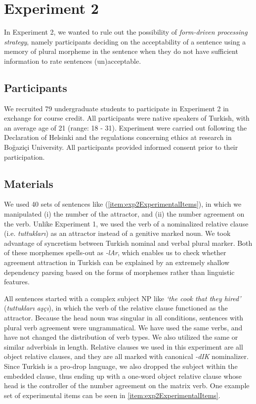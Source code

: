 \documentclass[doc,a4paper,man,natbib,floatsintext,noextraspace]{apa6}\usepackage[]{graphicx}\usepackage[]{color}
\begin{document}
\section{Experiment 2} \label{sec:exp2}







In Experiment 2, we wanted to rule out the possibility of \textit{form-driven processing strategy}, namely participants deciding on the acceptability of a sentence using a memory of plural morpheme in the sentence when they do not have sufficient information to rate sentences (un)acceptable. 
 

\subsection{Participants} \label{sec:exp2:participants}

We recruited 79 undergraduate students to participate in Experiment 2 in exchange for course credit. All participants were native speakers of Turkish, with an average age of 21 (range: 18 - 31). 
Experiment were carried out following the Declaration of Helsinki and the regulations concerning ethics at research in Bo\u{g}azi\c{c}i University. All participants provided informed consent prior to their participation.


\subsection{Materials} \label{sec:exp2:materials}

We used 40 sets of sentences like
(\ref{item:exp2ExperimentalItems}), in which we manipulated
(i) the number of the attractor, and
(ii) the number agreement on the verb. 
Unlike Experiment 1, we used the verb of a nominalized relative clause (i.e. \textit{tuttukları}) as an attractor instead of a genitive marked noun. 
We took advantage of syncretism between Turkish nominal and verbal plural marker. Both of these morphemes spells-out as \textit{-lAr}, which enables us to check whether agreement attraction in Turkish can be explained by an extremely shallow dependency parsing based on the forms of morphemes rather than linguistic features.


All sentences started with a complex subject NP like \textit{`the cook that they hired'} (\textit{tuttukları aşçı}), in which the verb of the relative clause functioned as the attractor. Because the head noun was singular in all conditions, sentences with plural verb agreement were ungrammatical.  
We have used the same verbs, and have not changed the distribution of verb types. We also utilized the same or similar adverbials in length.
Relative clauses we used in this experiment are all object relative clauses, and they are all marked with canonical \textit{-dIK} nominalizer. Since Turkish is a pro-drop language, we also dropped the subject within the embedded clause, thus ending up with a one-word object relative clause whose head is the controller of the number agreement on the matrix verb. One example set of experimental items can be seen in \ref{item:exp2ExperimentalItems}.
\end{document}
